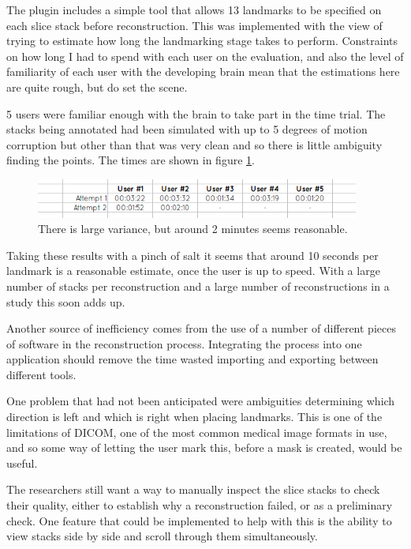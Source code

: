 The plugin includes a simple tool that allows 13 landmarks to be specified on each slice stack before reconstruction. This was implemented with the view of trying to estimate how long the landmarking stage takes to perform. Constraints on how long I had to spend with each user on the evaluation, and also the level of familiarity of each user with the developing brain mean that the estimations here are quite rough, but do set the scene.

5 users were familiar enough with the brain to take part in the time trial. The stacks being annotated had been simulated with up to 5 degrees of motion corruption but other than that was very clean and so there is little ambiguity finding the points. The times are shown in figure \ref{fig:landmarktimes}.

\begin{figure}[h]
    \centering
  \includegraphics[width=0.95\textwidth]{images/evaluation/graph_reconstruction_landmark_times.png}
    \caption{There is large variance, but around 2 minutes seems reasonable.}\label{fig:landmarktimes}
\end{figure}

Taking these results with a pinch of salt it seems that around 10 seconds per landmark is a reasonable estimate, once the user is up to speed. With a large number of stacks per reconstruction and a large number of reconstructions in a study this soon adds up.

Another source of inefficiency comes from the use of a number of different pieces of software in the reconstruction process. Integrating the process into one application should remove the time wasted importing and exporting between different tools.

One problem that had not been anticipated were ambiguities determining which direction is left and which is right when placing landmarks. This is one of the limitations of DICOM, one of the most common medical image formats in use, and so some way of letting the user mark this, before a mask is created, would be useful.

The researchers still want a way to manually inspect the slice stacks to check their quality, either to establish why a reconstruction failed, or as a preliminary check. One feature that could be implemented to help with this is the ability to view stacks side by side and scroll through them simultaneously.

